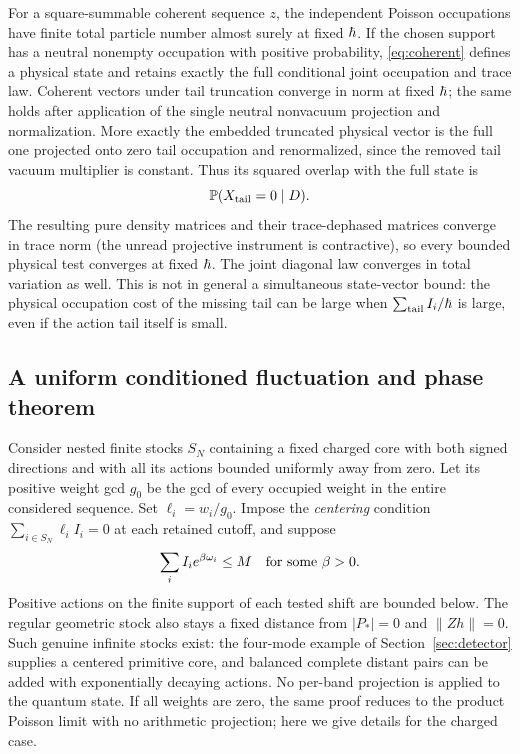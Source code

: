 For a square-summable coherent sequence \(z\), the independent Poisson occupations have finite total particle number almost surely at fixed \(\hbar\). If the chosen support has a neutral nonempty occupation with positive probability, \eqref{eq:coherent} defines a physical state and retains exactly the full conditional joint occupation and trace law. Coherent vectors under tail truncation converge in norm at fixed \(\hbar\); the same holds after application of the single neutral nonvacuum projection and normalization. More exactly the embedded truncated physical vector is the full one projected onto zero tail occupation and renormalized, since the removed tail vacuum multiplier is constant. Thus its squared overlap with the full state is
\begin{equation}\label{eq:overlap}
 \mathbb P(X_{\rm tail}=0\mid D).
\end{equation}
The resulting pure density matrices and their trace-dephased matrices converge in trace norm (the unread projective instrument is contractive), so every bounded physical test converges at fixed \(\hbar\). The joint diagonal law converges in total variation as well. This is not in general a simultaneous state-vector bound: the physical occupation cost of the missing tail can be large when \(\sum_{\rm tail} I_i/\hbar\) is large, even if the action tail itself is small.

\subsection{A uniform conditioned fluctuation and phase theorem}

Consider nested finite stocks \(S_N\) containing a fixed charged core with both signed directions and with all its actions bounded uniformly away from zero. Let its positive weight gcd \(g_0\) be the gcd of every occupied weight in the entire considered sequence. Set \(\ell_i=w_i/g_0\). Impose the \emph{centering} condition \(\sum_{i\in S_N}\ell_i I_i=0\) at each retained cutoff, and suppose
\[
       \sum_i I_i e^{\beta\omega_i}\leq M
       \quad\hbox{for some }\beta>0 .
\]
Positive actions on the finite support of each tested shift are bounded below. The regular geometric stock also stays a fixed distance from \(|P_*|=0\) and \(\|Zh\|=0\). Such genuine infinite stocks exist: the four-mode example of Section~\ref{sec:detector} supplies a centered primitive core, and balanced complete distant pairs can be added with exponentially decaying actions. No per-band projection is applied to the quantum state. If all weights are zero, the same proof reduces to the product Poisson limit with no arithmetic projection; here we give details for the charged case.

